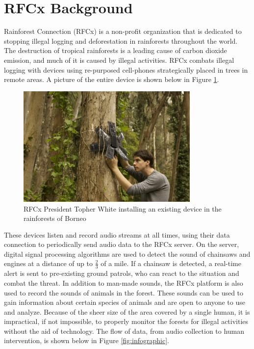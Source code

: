 \documentclass{article}
\newcommand{\ASSNMT}{Project Necromancer}
\numberwithin{figure}{section}
\numberwithin{equation}{section}
\begin{document}
{
\pagestyle{fancy}
\fancyhf{}
\lhead{\ASSNMT}
\rhead{\leftmark}
\setlength{\parindent}{0cm}
\newpage
\tableofcontents
\newpage
\section{RFCx Background} \label{sect:background}
Rainforest Connection (RFCx) is a non-profit organization that is dedicated to stopping illegal logging and deforestation in rainforests throughout the world. The destruction of tropical rainforests is a leading cause of carbon dioxide emission, and much of it is caused by illegal activities. RFCx combats illegal logging with devices using re-purposed cell-phones strategically placed in trees in remote areas. A picture of the entire device is shown below in Figure \ref{fig:device}.

\begin{figure}[H]
  \centering
  \includegraphics[width=0.8\textwidth]{device}
  \caption{RFCx President Topher White installing an existing device in the rainforests of Borneo}
  \label{fig:device}
\end{figure}
\newpage

These devices listen and record audio streams at all times, using their data connection to periodically send audio data to the RFCx server. On the server, digital signal processing algorithms are used to detect the sound of chainsaws and engines at a distance of up to $\frac{2}{3}$ of a mile. If a chainsaw is detected, a real-time alert is sent to pre-existing ground patrols, who can react to the situation and combat the threat. In addition to man-made sounds, the RFCx platform is also used to record the sounds of animals in the forest. These sounds can be used to gain information about certain species of animals and are open to anyone to use and analyze. Because of the sheer size of the area covered by a single human, it is impractical, if not impossible, to properly monitor the forests for illegal activities without the aid of technology. The flow of data, from audio collection to human intervention, is shown below in Figure \ref{fig:infographic}.

}
\end{document}
